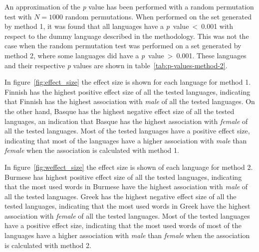 An approximation of the \emph{p} value has been performed with a random permutation test with $N = 1000$ random permutations. When performed on the set generated by method 1, it
was found that all languages have a \mbox{\emph{p} value < 0.001} with respect to the dummy
language described in the methodology. This was not the case when the random permutation
test was performed on a set generated by method 2, where some languages did have a
\mbox{\emph{p} value > 0.001}. These languages and their respective \emph{p} values
are shown in table~\ref{tab:p-values-method-2}.

In figure~\ref{fig:effect_size} the effect size is shown for each language for method 1.
Finnish has the highest positive effect size of all the tested languages, indicating that
Finnish has the highest association with \emph{male} of all the tested languages.
On the other hand, Basque has the highest negative effect size of all the tested languages,
an indication that Basque has the highest association with \emph{female} of all the tested
languages.
Most of the tested languages have a positive effect size, indicating that most of the
languages have a higher association with \emph{male} than \emph{female} when the
association is calculated with method 1.

In figure~\ref{fig:weffect_size} the effect size is shown of each language for method 2.
Burmese has highest positive effect size of all the tested languages, indicating that
the most used words in Burmese have the highest association with \emph{male} of all the
tested languages.
Greek has the highest negative effect size of all the tested languages, indicating that
the most used words in Greek have the highest association with \emph{female} of all the
tested languages.
Most of the tested languages have a positive effect size, indicating that the most used
words of most of the languages have a higher association with \emph{male} than
\emph{female} when the association is calculated with method 2.
